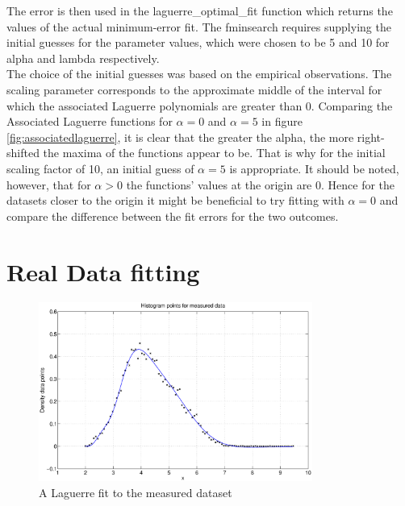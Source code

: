 \documentclass[a4paper]{article}
\numberwithin{equation}{section}
\begin{document}


\noindent The error is then used in the laguerre\_optimal\_fit function which returns the values of the actual minimum-error fit. The fminsearch requires supplying the initial guesses for the parameter values, which were chosen to be 5 and 10 for alpha and lambda respectively. \\

\noindent The choice of the initial guesses was based on the empirical observations. The scaling parameter corresponds to the approximate middle of the interval for which the associated Laguerre polynomials are greater than 0.
Comparing the Associated Laguerre functions for $\alpha = 0$ and $\alpha = 5$ in figure \ref{fig:associatedlaguerre}, it is clear that the greater the alpha, the more right-shifted the maxima of the functions appear to be. That is why for the initial scaling factor of 10, an initial guess of $\alpha = 5$ is appropriate. It should be noted, however, that for $\alpha > 0$ the functions' values at the origin are 0. Hence for the datasets closer to the origin it might be beneficial to try fitting with $\alpha = 0$ and compare the difference between the fit errors for the two outcomes.



\section{Real Data fitting}

\begin{figure}[!h]
\centering
\includegraphics[width=0.8\textwidth]{real_data_fit.eps}
\caption{\label{fig:realdataset}A Laguerre fit to the measured dataset}
\end{figure}
\end{document}
